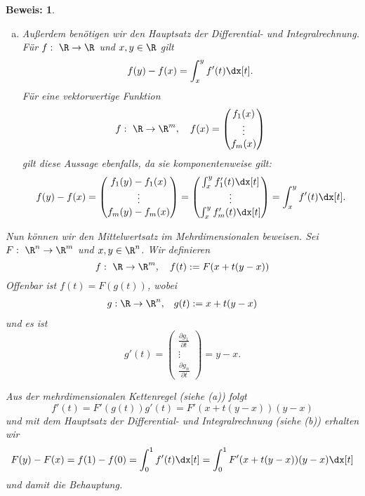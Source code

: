 \documentclass[
]{mycourse}
\theoremstyle{mythm}
\theoremstyle{break}
\newtheorem*{beweis}{Beweis:}
\begin{document}
\begin{appendix}
\begin{beweis}
\begin{enumerate}[(a)]
\item Außerdem benötigen wir den Hauptsatz der Differential- und Integralrechnung. Für
$f:\ \R\to \R$ und $x,y\in \R$ gilt
\[
f(y)-f(x)=\int_x^y f'(t)\dx[t].
\]
Für eine vektorwertige Funktion 
\[
f:\ \R\to \R^m,\quad f(x)=\begin{pmatrix}f_1(x)\\ \vdots \\ f_m(x)\end{pmatrix} 
\]
gilt diese Aussage ebenfalls, da sie komponentenweise gilt:
\[
f(y)-f(x)=\begin{pmatrix}f_1(y)-f_1(x)\\ \vdots \\ f_m(y)-f_m(x)\end{pmatrix} 
=\begin{pmatrix}\int_x^y f_1'(t)\dx[t]\\ \vdots \\ \int_x^y f_m'(t)\dx[t]\end{pmatrix} 
= \int_x^y f'(t)\dx[t].
\]
\end{enumerate}
Nun können wir den Mittelwertsatz im Mehrdimensionalen beweisen. 
Sei $F:\ \R^n\to \R^m$ und $x,y\in \R^n$. Wir definieren
\[
f:\ \R\to \R^m, \quad f(t):=F(x+t(y-x))
\]
Offenbar ist $f(t)=F(g(t))$, wobei
\begin{align*}
g: \R\to \R^n, & \quad g(t):=x+t(y-x)\\
\end{align*}
und es ist
\[
g'(t)=\begin{pmatrix} 
\frac{\partial g_1}{\partial t}\\ \vdots \\ \frac{\partial g_n}{\partial t}
\end{pmatrix}
= y-x.
\]

Aus der mehrdimensionalen Kettenregel (siehe (a)) folgt 
\[
f'(t)=F'(g(t))g'(t)=F'(x+t(y-x))(y-x)
\]
und mit dem Hauptsatz der Differential- und Integralrechnung (siehe (b)) erhalten wir
\[
F(y)-F(x)=f(1)-f(0)=\int_0^1 f'(t)\dx[t]=\int_0^1 F'(x+t(y-x))(y-x)\dx[t]
\]
und damit die Behauptung.
\end{beweis}




\end{appendix}
\end{document}
